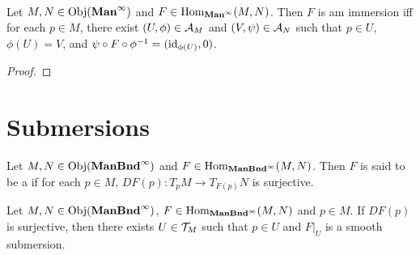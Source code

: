 \documentclass{book}
\begin{document}
\begin{ex}   \\
	Let $M,N \in \operatorname{Obj}(\operatorname*{\text{\textbf{Man}}^{\infty}})$ and $F \in \operatorname{Hom}_{\operatorname*{\text{\textbf{Man}}^{\infty}}}(M, N)$. Then $F$ is am immersion iff for each $p \in M$, there exist $(U, \phi) \in \mathcal{A}_M$ and $(V, \psi) \in \mathcal{A}_N$ such that $p \in U$, $\phi(U) = V$, and $\psi \circ F \circ \phi^{-1} = (\operatorname{id}_{\phi(U)}, 0)$.
\end{ex}

\begin{proof}
\end{proof}

\begin{ex}
\end{ex}





































	\newpage
	\section{Submersions}
	
	
	\begin{defn} 
		Let $M, N \in \operatorname{Obj}(\operatorname*{\text{\textbf{ManBnd}}^{\infty}})$ and $F \in \operatorname{Hom}_{\operatorname*{\text{\textbf{ManBnd}}^{\infty}}}(M,N)$. Then $F$ is said to be a  if for each $p \in M$, $DF(p) :T_pM\rightarrow T_{F(p)}N$ is surjective.
	\end{defn}

	\begin{ex} 
		Let $M, N \in \operatorname{Obj}(\operatorname*{\text{\textbf{ManBnd}}^{\infty}})$, $F \in \operatorname{Hom}_{\operatorname*{\text{\textbf{ManBnd}}^{\infty}}}(M, N)$ and $p \in M$. If $DF(p)$ is surjective, then there exists $U \in \mathcal{T}_M$ such that $p \in U$ and $F|_U$ is a smooth submersion.
	\end{ex}
	
\end{document}
